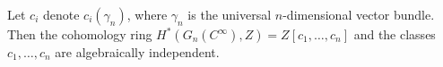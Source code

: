 Let $c_i$ denote $c_i(\gamma_n)$, where $\gamma_n$ is the universal $n$-dimensional vector bundle. Then the cohomology ring $H^*(G_n(C^\infty), Z) = Z[c_1, \dots, c_n]$ and the classes $c_1, \dots, c_n$ are algebraically independent.
